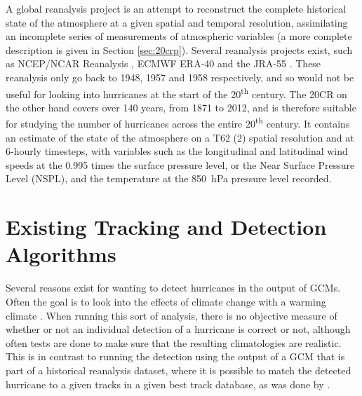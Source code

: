 \documentclass[pdftex,12pt,a4paper]{report}
\newcommand{\ts}{\textsuperscript}
\begin{document}

A global reanalysis project is an attempt to reconstruct the complete historical state of the
atmosphere at a given spatial and temporal resolution, assimilating an incomplete series of
measurements of atmospheric variables (a more complete description is given in Section
\ref{sec:20crp}). %
Several reanalysis projects exist, such as NCEP/NCAR Reanalysis \parencite{kalnay1996ncep,
kistler2001ncep}, ECMWF ERA-40 \parencite{uppala2005era} and the JRA-55
\parencite{ebita2011japanese}. These reanalysis only go back to 1948, 1957 and 1958  respectively,
and so would not be useful for looking into hurricanes at the start of the 20\ts{th} century. The
20CR on the other hand covers over 140 years, from 1871 to 2012, and is therefore suitable for
studying the number of hurricanes across the entire 20\ts{th} century. It contains an estimate of
the state of the atmosphere on a T62 (2\textdegree) spatial resolution and at 6-hourly timesteps,
with variables such as the longitudinal and latitudinal wind speeds at the 0.995 times the surface
pressure level, or the Near Surface Pressure Level (NSPL), and the temperature at the \SI{850}{hPa}
pressure level recorded.

\section{Existing Tracking and Detection Algorithms}


Several reasons exist for wanting to detect hurricanes in the output of GCMs. Often the goal is to
look into the effects of climate change with a warming climate \parencite{bengtsson1996will,
sugi2002influence, yoshimura2006influence}. When running this sort of analysis, there is no objective measure of whether or not
an individual detection of a hurricane is correct or not, although often tests are done to make sure
that the resulting climatologies are realistic. This is in contrast to running the detection using
the output of a GCM that is part of a historical reanalysis dataset, where it is possible to match
the detected hurricane to a given tracks in a given best track database, as was done by
\textcite{walsh1997objective}.
\end{document}
